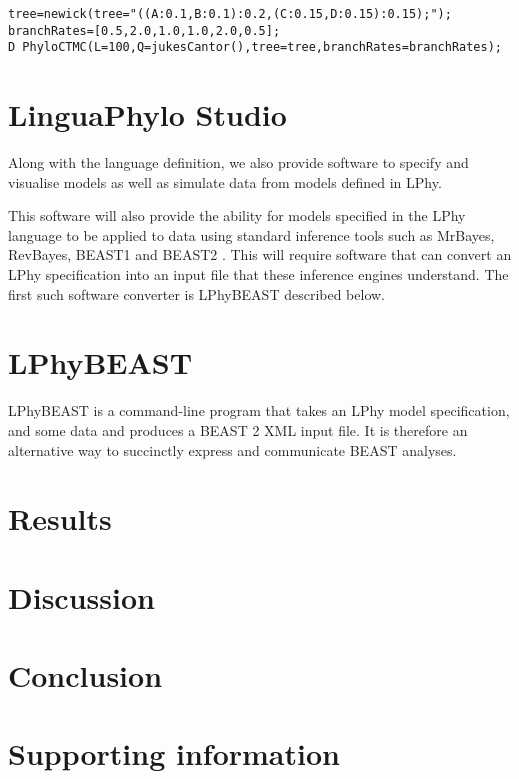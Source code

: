 \documentclass[10pt,letterpaper,table]{article}
\begin{document}
{\begin{alltt}
  tree = newick(tree="((A:0.1,B:0.1):0.2,(C:0.15,D:0.15):0.15);");
  branchRates = [0.5, 2.0, 1.0, 1.0, 2.0, 0.5];
  D ~ PhyloCTMC(L=100, Q=jukesCantor(), tree=tree, branchRates=branchRates);
\end{alltt}

\section*{LinguaPhylo Studio}

Along with the language definition, we also provide software to
specify and visualise models as well as simulate data from models
defined in LPhy.

This software will also provide the ability for models specified in
the LPhy language to be applied to data using standard inference tools
such as MrBayes, RevBayes, BEAST1 and BEAST2
\cite{bouckaert2014beastanalysis,DrummondBouckaert2015,bouckaert2019beastanalysis}.
This will require software that can convert an LPhy specification into
an input file that these inference engines understand.
The first such software converter is LPhyBEAST described below.

\section*{LPhyBEAST}

LPhyBEAST is a command-line program that takes an LPhy model
specification, and some data and produces a BEAST 2 XML input file.
It is therefore an alternative way to succinctly express and
communicate BEAST analyses.

\section*{Results}

\section*{Discussion}

\section*{Conclusion}

\section*{Supporting information}

}
\end{document}
